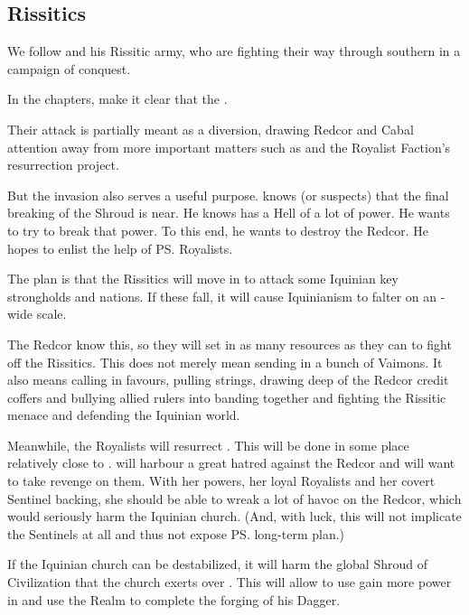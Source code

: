 \subsection{Rissitics}
We follow \Narkiza{} and his Rissitic army, who are fighting their way through southern \Velcad{} in a campaign of conquest. 

In the \Narkiza chapters, make it clear that the . 

Their attack is partially meant as a diversion, drawing Redcor and Cabal attention away from more important matters such as \Nithdornazsh{} and the Royalist Faction's resurrection project. 

But the invasion also serves a useful purpose. 
\Secherdamon{} knows (or suspects) that the final breaking of the Shroud is near. 
He knows \iquin{} has a Hell of a lot of power. 
He wants to try to break that power. 
To this end, he wants to destroy the Redcor. 
He hopes to enlist the help of \ps{\Shiaraid} Royalists. 

The plan is that the Rissitics will move in to attack some Iquinian key strongholds and nations. 
If these fall, it will cause Iquinianism to falter on an \Azmith-wide scale. 

The Redcor know this, so they will set in as many resources as they can to fight off the Rissitics. 
This does not merely mean sending in a bunch of Vaimons. 
It also means calling in favours, pulling strings, drawing deep of the Redcor credit coffers and bullying allied rulers into banding together and fighting the Rissitic menace and defending the Iquinian world.

Meanwhile, the Royalists will resurrect \Shiaraid. 
This will be done in some place relatively close to \Redce. 
\Shiaraid{} will harbour a great hatred against the Redcor and will want to take revenge on them. 
With her \sathariah{} powers, her loyal Royalists and her covert Sentinel backing, she should be able to wreak a lot of havoc on the Redcor, which would seriously harm the Iquinian church. 
(And, with luck, this will not implicate the Sentinels at all and thus not expose \ps{\Secherdamon} long-term plan.)

If the Iquinian church can be destabilized, it will harm the global Shroud of Civilization that the church exerts over \Azmith. 
This will allow \Secherdamon{} to use gain more power in \Azmith{} and use the Realm to complete the forging of his Dagger. 





